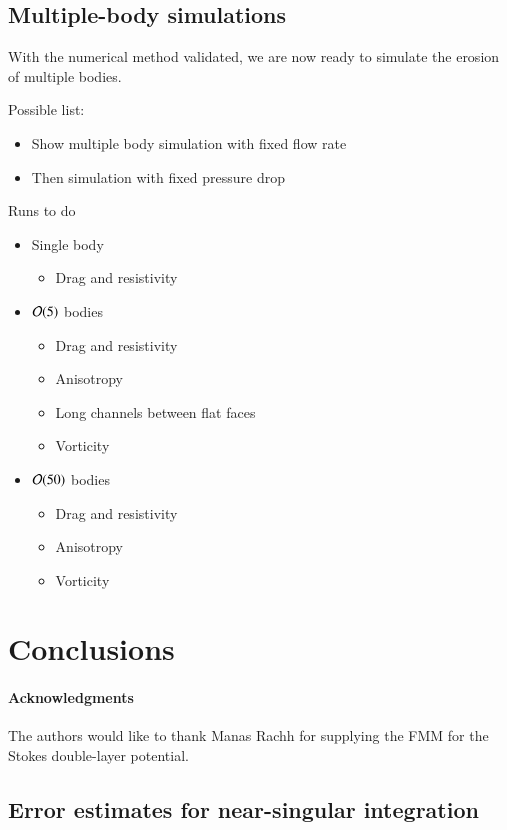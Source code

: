 \documentclass[preprint, 10pt]{elsarticle}
\begin{document}
\subsection{Multiple-body simulations}
With the numerical method validated, we are now ready to simulate the erosion of multiple bodies.

Possible list:
\begin{itemize}
\item Show multiple body simulation with fixed flow rate
\item Then simulation with fixed pressure drop
\end{itemize}



\newpage


Runs to do
\begin{itemize}
  \item Single body
  \begin{itemize}
    \item Drag and resistivity
  \end{itemize}
  \item ${\mathcal{O}}(5)$ bodies
  \begin{itemize}
    \item Drag and resistivity
    \item Anisotropy
    \item Long channels between flat faces
    \item Vorticity
  \end{itemize}
  \item ${\mathcal{O}}(50)$ bodies
  \begin{itemize}
    \item Drag and resistivity
    \item Anisotropy
    \item Vorticity
  \end{itemize}
\end{itemize}


\section{Conclusions\label{s:conclusions}}


\paragraph{\bf Acknowledgments} The authors would like to thank Manas
Rachh for supplying the FMM for the Stokes double-layer potential.


\begin{appendices}
\section{Error estimates for near-singular integration \label{A:AppendixA}} 
\end{appendices}


 

\end{document}
